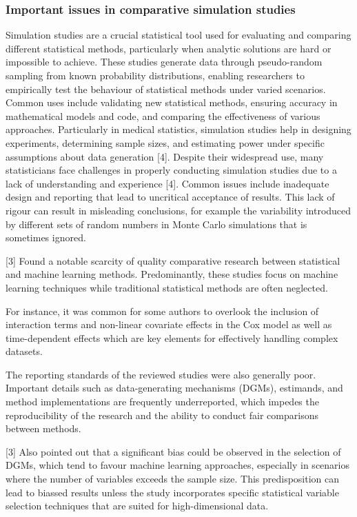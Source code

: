 \subsubsection{Important issues in comparative simulation studies}

\noindent 
Simulation studies are a crucial statistical tool used for evaluating and comparing different statistical methods, particularly when analytic solutions are hard or impossible to achieve. These studies generate data through pseudo-random sampling from known probability distributions, enabling researchers to empirically test the behaviour of statistical methods under varied scenarios. Common uses include validating new statistical methods, ensuring accuracy in mathematical models and code, and comparing the effectiveness of various approaches. Particularly in medical statistics, simulation studies help in designing experiments, determining sample sizes, and estimating power under specific assumptions about data generation [4]. Despite their widespread use, many statisticians face challenges in properly conducting simulation studies due to a lack of understanding and experience [4]. Common issues include inadequate design and reporting that lead to uncritical acceptance of results. This lack of rigour can result in misleading conclusions, for example the variability introduced by different sets of random numbers in Monte Carlo simulations that is sometimes ignored.

[3] Found a notable scarcity of quality comparative research between statistical and machine learning methods. Predominantly, these studies focus on machine learning techniques while traditional statistical methods are often neglected. 

For instance, it was common for some authors to overlook the inclusion of interaction terms and non-linear covariate effects in the Cox model as well as time-dependent effects which are key elements for effectively handling complex datasets.

The reporting standards of the reviewed studies were also generally poor. Important details such as data-generating mechanisms (DGMs), estimands, and method implementations are frequently underreported, which impedes the reproducibility of the research and the ability to conduct fair comparisons between methods. 

[3] Also pointed out that a significant bias could be observed in the selection of DGMs, which tend to favour machine learning approaches, especially in scenarios where the number of variables exceeds the sample size. This predisposition can lead to biassed results unless the study incorporates specific statistical variable selection techniques that are suited for high-dimensional data. 

